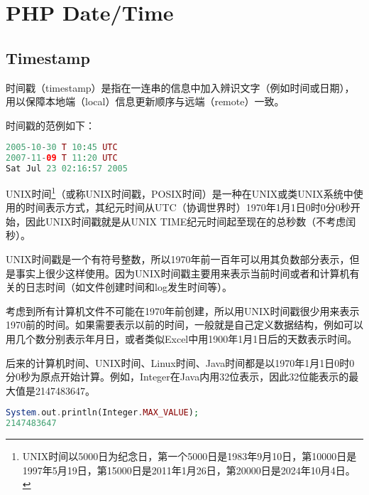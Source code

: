 \begin{lstlisting}[language=PHP]

\end{lstlisting}



\chapter{PHP Date/Time}

\section{Timestamp}

时间戳（timestamp）是指在一连串的信息中加入辨识文字（例如时间或日期），用以保障本地端（local）信息更新顺序与远端（remote）一致。

时间戳的范例如下：

\begin{lstlisting}[language=PHP]
2005-10-30 T 10:45 UTC
2007-11-09 T 11:20 UTC 
Sat Jul 23 02:16:57 2005
\end{lstlisting}

UNIX时间\footnote{UNIX时间以5000日为纪念日，第一个5000日是1983年9月10日，第10000日是1997年5月19日，第15000日是2011年1月26日，第20000日是2024年10月4日。}（或称UNIX时间戳，POSIX时间）是一种在UNIX或类UNIX系统中使用的时间表示方式，其纪元时间从UTC（协调世界时）1970年1月1日0时0分0秒开始，因此UNIX时间戳就是从UNIX TIME纪元时间起至现在的总秒数（不考虑闰秒）。


UNIX时间戳是一个有符号整数，所以1970年前一百年可以用其负数部分表示，但是事实上很少这样使用。因为UNIX时间戳主要用来表示当前时间或者和计算机有关的日志时间（如文件创建时间和log发生时间等）。

考虑到所有计算机文件不可能在1970年前创建，所以用UNIX时间戳很少用来表示1970前的时间。如果需要表示以前的时间，一般就是自己定义数据结构，例如可以用几个数分别表示年月日，或者类似Excel中用1900年1月1日后的天数表示时间。

后来的计算机时间、UNIX时间、Linux时间、Java时间都是以1970年1月1日0时0分0秒为原点开始计算。例如，Integer在Java内用32位表示，因此32位能表示的最大值是2147483647。

\begin{lstlisting}[language=PHP]
System.out.println(Integer.MAX_VALUE);
2147483647
\end{lstlisting}


